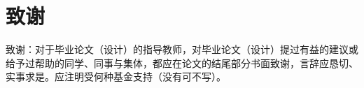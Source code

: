 \chapter{致谢}
致谢：对于毕业论文（设计）的指导教师，对毕业论文（设计）提过有益的建议或给予过帮助的同学、同事与集体，都应在论文的结尾部分书面致谢，言辞应恳切、实事求是。应注明受何种基金支持（没有可不写）。